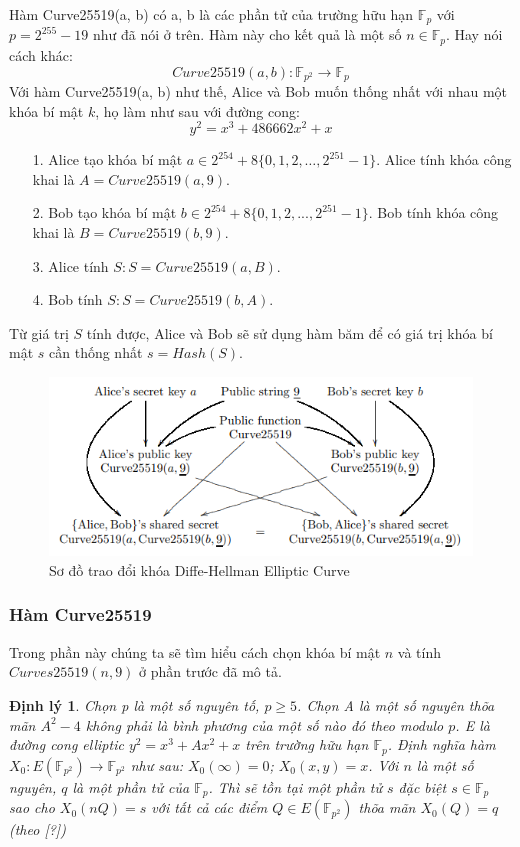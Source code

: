 \documentclass[a4paper,12pt]{report}
\newtheorem{theorem}{Định lý}[chapter]
\begin{document}
Hàm Curve25519(a, b) có a, b là các phần tử của trường hữu hạn $\mathbb{F}_p$ với $p = 2^{255} - 19$ như đã nói ở trên. Hàm này cho kết quả là một số $n \in \mathbb{F}_p$. Hay nói cách khác:
\begin{displaymath}
Curve25519(a, b): \mathbb{F}_{p^2} \rightarrow \mathbb{F}_p
\end{displaymath}
Với hàm Curve25519(a, b) như thế, Alice và Bob muốn thống nhất với nhau một khóa bí mật $k$, họ làm như sau với đường cong:
\begin{displaymath}
y^2 = x^3 + 486662x^2 + x
\end{displaymath}
\begin{itemize}
\item[1. ] Alice tạo khóa bí mật $a \in 2^{254} + 8\{0, 1, 2, \ldots, 2^{251} - 1\}$. Alice tính khóa công khai là $A = Curve25519(a, 9)$.
\item[2. ] Bob tạo khóa bí mật $b \in 2^{254} + 8\{0, 1, 2, ..., 2^{251} - 1\}$. Bob tính khóa công khai là $B = Curve25519(b, 9)$.
\item[3. ] Alice tính $S: S = Curve25519(a, B)$.
\item[4. ] Bob tính $S: S = Curve25519(b, A)$.
\end{itemize}
Từ giá trị $S$ tính được, Alice và Bob sẽ sử dụng hàm băm để có giá trị khóa bí mật $s$ cần thống nhất $s = Hash(S)$.
\begin{center}
\begin{figure}[H]
\centering
\includegraphics[width=0.85\linewidth]{../im23.png}
\caption{Sơ đồ trao đổi khóa Diffe-Hellman Elliptic Curve}
\end{figure}
\end{center}
\subsubsection{Hàm Curve25519}
Trong phần này chúng ta sẽ tìm hiểu cách chọn khóa bí mật $n$ và tính $Curves25519(n, 9)$ ở phần trước đã mô tả.
\begin{theorem} \label{dl4.1}
Chọn p là một số nguyên tố, $p \geq 5$. Chọn A là một số nguyên thõa mãn $A^2 - 4$ không phải là bình phương của một số nào đó theo modulo $p$. E là đường cong elliptic $y^2 = x^3 + Ax^2 + x$ trên trường hữu hạn $\mathbb{F}_p$. Định nghĩa hàm $X_0 : E(\mathbb{F}_{p^2} ) \rightarrow  \mathbb{F}_{p^2}$ như sau: $X_0(\infty) = 0$; $X_0(x, y) = x$. Với $n$ là một số nguyên, $q$ là một phần tử của $\mathbb{F}_p$. Thì sẽ tồn tại một phần tử $s$ đặc biệt $s \in \mathbb{F}_p$ sao cho $X_0(nQ) = s$ với tất cả các điểm $Q \in E(\mathbb{F}_{p^2} )$ thõa mãn $X_0(Q) = q$ (theo [?])
\end{theorem}
\end{document}

